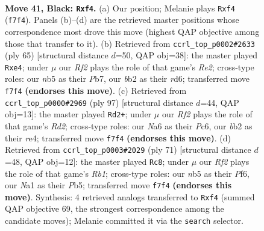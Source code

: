 \documentclass[11pt]{article}
\begin{document}
\clearpage

\begin{figure}[p]\centering
\begin{subfigure}{0.46\textwidth}\centering
\resizebox{\linewidth}{!}{%
\newchessgame
\chessboard[
  setfen={5k2/1p2pr1p/n5p1/pNp5/5P1P/2P2P2/PB1R4/n4K2 b - - 8 41},
  showmover=false,
  pgfstyle=straightmove, color=movearrow, markmove={f7-f4}
]}
\caption{}
\end{subfigure}\hfill
\begin{subfigure}{0.46\textwidth}\centering
\resizebox{\linewidth}{!}{%
\newchessgame
\chessboard[
  setfen={5k2/1p2r1pp/1pnR1p2/pB6/P3P3/2P5/1P3KPP/8 b - - 3 33},
  showmover=false,
  pgfstyle=straightmove, color=movearrow, markmove={e7-e4}
]}
\caption{}
\end{subfigure}
\\[4pt]
\begin{subfigure}{0.46\textwidth}\centering
\resizebox{\linewidth}{!}{%
\newchessgame
\chessboard[
  setfen={8/1p1r1pk1/2p1n1p1/p7/4R1PP/P1P5/1PB2K2/8 b - - 5 49},
  showmover=false,
  pgfstyle=straightmove, color=movearrow, markmove={d7-d2}
]}
\caption{}
\end{subfigure}\hfill
\begin{subfigure}{0.46\textwidth}\centering
\resizebox{\linewidth}{!}{%
\newchessgame
\chessboard[
  setfen={1r6/4k1p1/p3pp1p/1pPn3P/P7/5P2/1PK3P1/R3B3 b - - 12 36},
  showmover=false,
  pgfstyle=straightmove, color=movearrow, markmove={b8-c8}
]}
\caption{}
\end{subfigure}
\caption{\textbf{Move 41, Black: \texttt{Rxf4}.} (a) Our position; Melanie plays \texttt{Rxf4} (\texttt{f7f4}). Panels (b)--(d) are the retrieved master positions whose correspondence most drove this move (highest QAP objective among those that transfer to it). (b) Retrieved from \texttt{ccrl\_top\_p0002\#2633} (ply 65) [structural distance $d$=50, QAP obj=38]: the master played \texttt{Rxe4}; under $\mu$ our \emph{Rf2} plays the role of that game's \emph{Re2}; cross-type roles: our \emph{n}b5 as their \emph{P}b7, our \emph{b}b2 as their \emph{r}d6; transferred move \texttt{f7f4} \textbf{(endorses this move)}. (c) Retrieved from \texttt{ccrl\_top\_p0000\#2969} (ply 97) [structural distance $d$=44, QAP obj=13]: the master played \texttt{Rd2+}; under $\mu$ our \emph{Rf2} plays the role of that game's \emph{Rd2}; cross-type roles: our \emph{N}a6 as their \emph{P}c6, our \emph{b}b2 as their \emph{r}e4; transferred move \texttt{f7f4} \textbf{(endorses this move)}. (d) Retrieved from \texttt{ccrl\_top\_p0003\#2029} (ply 71) [structural distance $d$=48, QAP obj=12]: the master played \texttt{Rc8}; under $\mu$ our \emph{Rf2} plays the role of that game's \emph{Rb1}; cross-type roles: our \emph{n}b5 as their \emph{P}f6, our \emph{N}a1 as their \emph{P}b5; transferred move \texttt{f7f4} \textbf{(endorses this move)}. Synthesis: 4 retrieved analogs transferred to \texttt{Rxf4} (summed QAP objective 69, the strongest correspondence among the candidate moves); Melanie committed it via the \texttt{search} selector.}
\label{fig:thought-m81}
\end{figure}
\end{document}
